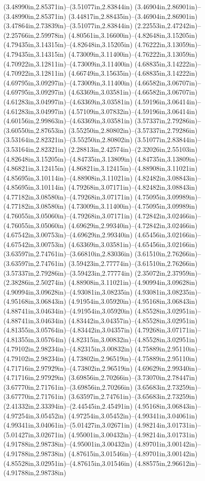 (3.48990in,2.85371in)--(3.51077in,2.83844in) (3.46904in,2.86901in)--(3.48990in,2.85371in) (3.44817in,2.88435in)--(3.46904in,2.86901in) (3.47864in,2.73839in)--(3.51077in,2.83844in) (2.22553in,2.47242in)--(2.25766in,2.59978in) (4.80561in,3.16600in)--(4.82648in,3.15205in) (4.79435in,3.14315in)--(4.82648in,3.15205in) (4.76222in,3.13059in)--(4.79435in,3.14315in) (4.73009in,3.11400in)--(4.76222in,3.13059in) (4.70922in,3.12811in)--(4.73009in,3.11400in) (4.68835in,3.14222in)--(4.70922in,3.12811in) (4.66749in,3.15635in)--(4.68835in,3.14222in) (4.69795in,3.09297in)--(4.73009in,3.11400in) (4.66582in,3.06707in)--(4.69795in,3.09297in) (4.63369in,3.03581in)--(4.66582in,3.06707in) (4.61283in,3.04997in)--(4.63369in,3.03581in) (4.59196in,3.06414in)--(4.61283in,3.04997in) (4.57109in,3.07832in)--(4.59196in,3.06414in) (4.60156in,2.99863in)--(4.63369in,3.03581in) (3.57337in,2.79286in)--(3.60550in,2.87653in) (3.55250in,2.80802in)--(3.57337in,2.79286in) (3.53164in,2.82321in)--(3.55250in,2.80802in) (3.51077in,2.83844in)--(3.53164in,2.82321in) (2.28813in,2.42574in)--(2.32026in,2.55103in) (4.82648in,3.15205in)--(4.84735in,3.13809in) (4.84735in,3.13809in)--(4.86821in,3.12415in) (4.86821in,3.12415in)--(4.88908in,3.11021in) (4.85695in,3.10114in)--(4.88908in,3.11021in) (4.82482in,3.08843in)--(4.85695in,3.10114in) (4.79268in,3.07171in)--(4.82482in,3.08843in) (4.77182in,3.08580in)--(4.79268in,3.07171in) (4.75095in,3.09989in)--(4.77182in,3.08580in) (4.73009in,3.11400in)--(4.75095in,3.09989in) (4.76055in,3.05060in)--(4.79268in,3.07171in) (4.72842in,3.02466in)--(4.76055in,3.05060in) (4.69629in,2.99340in)--(4.72842in,3.02466in) (4.67542in,3.00753in)--(4.69629in,2.99340in) (4.65456in,3.02166in)--(4.67542in,3.00753in) (4.63369in,3.03581in)--(4.65456in,3.02166in) (3.63597in,2.74761in)--(3.66810in,2.83036in) (3.61510in,2.76266in)--(3.63597in,2.74761in) (3.59423in,2.77774in)--(3.61510in,2.76266in) (3.57337in,2.79286in)--(3.59423in,2.77774in) (2.35072in,2.37959in)--(2.38286in,2.50274in) (4.88908in,3.11021in)--(4.90994in,3.09628in) (4.90994in,3.09628in)--(4.93081in,3.08235in) (4.93081in,3.08235in)--(4.95168in,3.06843in) (4.91954in,3.05920in)--(4.95168in,3.06843in) (4.88741in,3.04634in)--(4.91954in,3.05920in) (4.85528in,3.02951in)--(4.88741in,3.04634in) (4.83442in,3.04357in)--(4.85528in,3.02951in) (4.81355in,3.05764in)--(4.83442in,3.04357in) (4.79268in,3.07171in)--(4.81355in,3.05764in) (4.82315in,3.00832in)--(4.85528in,3.02951in) (4.79102in,2.98234in)--(4.82315in,3.00832in) (4.75889in,2.95110in)--(4.79102in,2.98234in) (4.73802in,2.96519in)--(4.75889in,2.95110in) (4.71716in,2.97929in)--(4.73802in,2.96519in) (4.69629in,2.99340in)--(4.71716in,2.97929in) (3.69856in,2.70266in)--(3.73070in,2.78447in) (3.67770in,2.71761in)--(3.69856in,2.70266in) (3.65683in,2.73259in)--(3.67770in,2.71761in) (3.63597in,2.74761in)--(3.65683in,2.73259in) (2.41332in,2.33394in)--(2.44545in,2.45491in) (4.95168in,3.06843in)--(4.97254in,3.05452in) (4.97254in,3.05452in)--(4.99341in,3.04061in) (4.99341in,3.04061in)--(5.01427in,3.02671in) (4.98214in,3.01731in)--(5.01427in,3.02671in) (4.95001in,3.00432in)--(4.98214in,3.01731in) (4.91788in,2.98738in)--(4.95001in,3.00432in) (4.89701in,3.00142in)--(4.91788in,2.98738in) (4.87615in,3.01546in)--(4.89701in,3.00142in) (4.85528in,3.02951in)--(4.87615in,3.01546in) (4.88575in,2.96612in)--(4.91788in,2.98738in) 